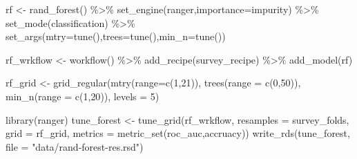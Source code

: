 \documentclass[
]{article}
\newenvironment{Shaded}{\begin{snugshade}}{\end{snugshade}}
\newcommand{\AttributeTok}[1]{\textcolor[rgb]{0.77,0.63,0.00}{#1}}
\newcommand{\DecValTok}[1]{\textcolor[rgb]{0.00,0.00,0.81}{#1}}
\newcommand{\FunctionTok}[1]{\textcolor[rgb]{0.00,0.00,0.00}{#1}}
\newcommand{\NormalTok}[1]{#1}
\newcommand{\OtherTok}[1]{\textcolor[rgb]{0.56,0.35,0.01}{#1}}
\newcommand{\SpecialCharTok}[1]{\textcolor[rgb]{0.00,0.00,0.00}{#1}}
\newcommand{\StringTok}[1]{\textcolor[rgb]{0.31,0.60,0.02}{#1}}
\begin{document}
\begin{Shaded}
\begin{Highlighting}[]
\NormalTok{rf }\OtherTok{\textless{}{-}} \FunctionTok{rand\_forest}\NormalTok{() }\SpecialCharTok{\%\textgreater{}\%}
  \FunctionTok{set\_engine}\NormalTok{(}\StringTok{\textquotesingle{}ranger\textquotesingle{}}\NormalTok{,}\AttributeTok{importance=}\StringTok{\textquotesingle{}impurity\textquotesingle{}}\NormalTok{) }\SpecialCharTok{\%\textgreater{}\%}
  \FunctionTok{set\_mode}\NormalTok{(}\StringTok{\textquotesingle{}classification\textquotesingle{}}\NormalTok{) }\SpecialCharTok{\%\textgreater{}\%}
  \FunctionTok{set\_args}\NormalTok{(}\AttributeTok{mtry=}\FunctionTok{tune}\NormalTok{(),}\AttributeTok{trees=}\FunctionTok{tune}\NormalTok{(),}\AttributeTok{min\_n=}\FunctionTok{tune}\NormalTok{())}

\NormalTok{rf\_wrkflow }\OtherTok{\textless{}{-}} \FunctionTok{workflow}\NormalTok{() }\SpecialCharTok{\%\textgreater{}\%}
  \FunctionTok{add\_recipe}\NormalTok{(survey\_recipe) }\SpecialCharTok{\%\textgreater{}\%}
  \FunctionTok{add\_model}\NormalTok{(rf)}

\NormalTok{rf\_grid }\OtherTok{\textless{}{-}} \FunctionTok{grid\_regular}\NormalTok{(}\FunctionTok{mtry}\NormalTok{(}\AttributeTok{range=}\FunctionTok{c}\NormalTok{(}\DecValTok{1}\NormalTok{,}\DecValTok{21}\NormalTok{)), }
                        \FunctionTok{trees}\NormalTok{(}\AttributeTok{range =} \FunctionTok{c}\NormalTok{(}\DecValTok{0}\NormalTok{,}\DecValTok{50}\NormalTok{)),}
                        \FunctionTok{min\_n}\NormalTok{(}\AttributeTok{range =} \FunctionTok{c}\NormalTok{(}\DecValTok{1}\NormalTok{,}\DecValTok{20}\NormalTok{)),}
                        \AttributeTok{levels =} \DecValTok{5}\NormalTok{)}
\end{Highlighting}
\end{Shaded}

\begin{Shaded}
\begin{Highlighting}[]
\FunctionTok{library}\NormalTok{(ranger)}
\NormalTok{tune\_forest }\OtherTok{\textless{}{-}} \FunctionTok{tune\_grid}\NormalTok{(rf\_wrkflow, }\AttributeTok{resamples =}\NormalTok{ survey\_folds, }\AttributeTok{grid =}\NormalTok{ rf\_grid, }\AttributeTok{metrics =} \FunctionTok{metric\_set}\NormalTok{(roc\_auc,accruacy))}
\FunctionTok{write\_rds}\NormalTok{(tune\_forest, }\AttributeTok{file =} \StringTok{"data/rand{-}forest{-}res.rsd"}\NormalTok{)}
\end{Highlighting}
\end{Shaded}
\end{document}
